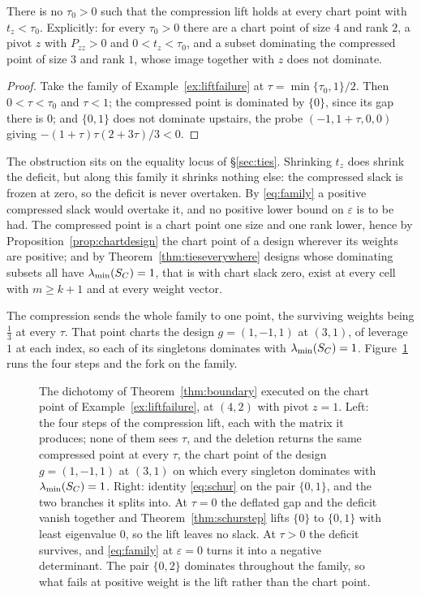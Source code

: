 \begin{theorem}[Lean]\label{thm:sharp}
There is no $\tau_0>0$ such that the compression lift holds at every
chart point with $t_z<\tau_0$.  Explicitly: for every $\tau_0>0$ there
are a chart point of size $4$ and rank $2$, a pivot $z$ with $P_{zz}>0$
and $0<t_z<\tau_0$, and a subset dominating the compressed point of size
$3$ and rank $1$, whose image together with $z$ does not dominate.
\end{theorem}

\begin{proof}
Take the family of Example~\ref{ex:liftfailure} at
$\tau=\min\{\tau_0,1\}/2$.  Then $0<\tau<\tau_0$ and $\tau<1$; the
compressed point is dominated by $\{0\}$, since its gap there is $0$; and
$\{0,1\}$ does not dominate upstairs, the probe $(-1,1+\tau,0,0)$ giving
$-(1+\tau)\tau(2+3\tau)/3<0$.
\end{proof}

The obstruction sits on the equality locus of \S\ref{sec:ties}.
Shrinking $t_z$ does shrink the deficit, but along this family it shrinks
nothing else: the compressed slack is frozen at zero, so the deficit is
never overtaken.  By \eqref{eq:family} a positive compressed slack would
overtake it, and no positive lower bound on $\varepsilon$ is to be had.
The compressed point is a chart point one size and one rank lower, hence
by Proposition~\ref{prop:chartdesign} the chart point of a design
wherever its weights are positive; and by
Theorem~\ref{thm:tieseverywhere} designs whose dominating subsets all
have $\lambda_{\min}(S_{C})=1$, that is with chart slack zero, exist at every cell
with $m\ge k+1$ and at every weight vector.

The compression sends the whole family to one point, the surviving
weights being $\tfrac13$ at every $\tau$.  That point charts the design
$g=(1,-1,1)$ at $(3,1)$, of leverage $1$ at each index, so each of its
singletons dominates with $\lambda_{\min}(S_{C})=1$.
Figure~\ref{fig:boundarytrace} runs the four steps and the fork on the
family.

\begin{figure}[ht]
  \centering
  
  \caption{The dichotomy of Theorem~\ref{thm:boundary} executed on the
  chart point of Example~\ref{ex:liftfailure}, at $(4,2)$ with pivot $z=1$.
  Left: the four steps of the compression lift, each with the matrix it
  produces; none of them sees $\tau$, and the deletion returns the same
  compressed point at every $\tau$, the chart point of the design
  $g=(1,-1,1)$ at $(3,1)$ on which every singleton dominates with
  $\lambda_{\min}(S_{C})=1$.  Right: identity \eqref{eq:schur} on the pair
  $\{0,1\}$, and the two branches it splits into.  At $\tau=0$ the
  deflated gap and the deficit vanish together and
  Theorem~\ref{thm:schurstep} lifts $\{0\}$ to $\{0,1\}$ with least
  eigenvalue $0$, so the lift leaves no slack.  At $\tau>0$ the deficit
  survives, and \eqref{eq:family} at $\varepsilon=0$ turns it into a
  negative determinant.  The pair $\{0,2\}$ dominates throughout the
  family, so what fails at positive weight is the lift rather than the
  chart point.}
  \label{fig:boundarytrace}
\end{figure}

